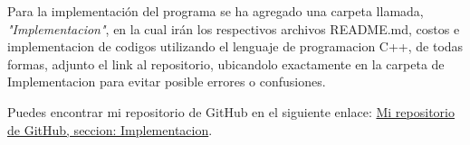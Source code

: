 Para la implementación del programa se ha agregado una carpeta llamada, \textit{"Implementacion"}, en la cual irán los respectivos archivos README.md, costos e implementacion de codigos utilizando el lenguaje de programacion C++, de todas formas, adjunto el link al repositorio, ubicandolo exactamente en la carpeta de Implementacion para evitar posible errores o confusiones.


Puedes encontrar mi repositorio de GitHub en el siguiente enlace: 
\href{https://github.com/rodrigo-ramirezd/Tareas_INF221/tree/main/Tarea_2%263/Implementation}{Mi repositorio de GitHub, seccion: Implementacion}.